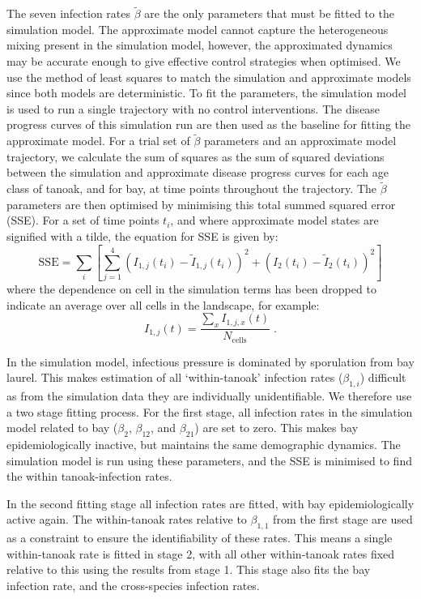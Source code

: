 The seven infection rates $\tilde{\beta}$ are the only parameters that must be fitted to the simulation model. The approximate model cannot capture the heterogeneous mixing present in the simulation model, however, the approximated dynamics may be accurate enough to give effective control strategies when optimised. We use the method of least squares to match the simulation and approximate models since both models are deterministic. To fit the parameters, the simulation model is used to run a single trajectory with no control interventions. The disease progress curves of this simulation run are then used as the baseline for fitting the approximate model. For a trial set of $\tilde{\beta}$ parameters and an approximate model trajectory, we calculate the sum of squares as the sum of squared deviations between the simulation and approximate disease progress curves for each age class of tanoak, and for bay, at time points throughout the trajectory. The $\tilde{\beta}$ parameters are then optimised by minimising this total summed squared error (SSE). For a set of time points $t_i$, and where approximate model states are signified with a tilde, the equation for SSE is given by:
\begin{equation}
    \mathrm{SSE} = \sum_{i}\left[\sum_{j=1}^4\left(I_{1,j}(t_i) - \tilde{I}_{1,j}(t_i)\right)^2 + \left(I_{2}(t_i) - \tilde{I}_{2}(t_i)\right)^2\right]
\end{equation}
where the dependence on cell in the simulation terms has been dropped to indicate an average over all cells in the landscape, for example:
\begin{equation}
    I_{1,j}(t) = \frac{\sum_xI_{1,j,x}(t)}{N_\textrm{cells}}\;.
\end{equation}

In the simulation model, infectious pressure is dominated by sporulation from bay laurel. This makes estimation of all `within-tanoak' infection rates ($\beta_{1,i}$) difficult as from the simulation data they are individually unidentifiable. We therefore use a two stage fitting process. For the first stage, all infection rates in the simulation model related to bay ($\beta_2$, $\beta_{12}$, and $\beta_{21}$) are set to zero. This makes bay epidemiologically inactive, but maintains the same demographic dynamics. The simulation model is run using these parameters, and the SSE is minimised to find the within tanoak-infection rates.

In the second fitting stage all infection rates are fitted, with bay epidemiologically active again. The within-tanoak rates relative to $\beta_{1,1}$ from the first stage are used as a constraint to ensure the identifiability of these rates. This means a single within-tanoak rate is fitted in stage 2, with all other within-tanoak rates fixed relative to this using the results from stage 1. This stage also fits the bay infection rate, and the cross-species infection rates.

